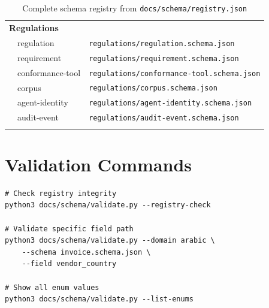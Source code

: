 \documentclass[11pt,a4paper]{report}
\newcommand{\schemapath}[1]{\texttt{\textcolor{pathcolor}{#1}}}
\begin{document}
\begin{longtable}{@{}p{3cm}p{4cm}p{5cm}@{}}
\midrule
\multicolumn{3}{l}{\textbf{Regulations}} \\
& regulation & \schemapath{regulations/regulation.schema.json} \\
& requirement & \schemapath{regulations/requirement.schema.json} \\
& conformance-tool & \schemapath{regulations/conformance-tool.schema.json} \\
& corpus & \schemapath{regulations/corpus.schema.json} \\
& agent-identity & \schemapath{regulations/agent-identity.schema.json} \\
& audit-event & \schemapath{regulations/audit-event.schema.json} \\
\bottomrule
\caption{Complete schema registry from \texttt{docs/schema/registry.json}}
\end{longtable}

\section{Validation Commands}

\begin{mdframed}[style=schemabox]
\begin{verbatim}
# Check registry integrity
python3 docs/schema/validate.py --registry-check

# Validate specific field path
python3 docs/schema/validate.py --domain arabic \
    --schema invoice.schema.json \
    --field vendor_country

# Show all enum values
python3 docs/schema/validate.py --list-enums
\end{verbatim}
\end{mdframed}
\end{document}
